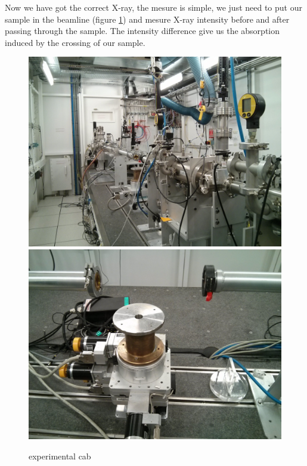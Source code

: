 \documentclass[11pt,a4paper,oneside]{report}
\begin{document}
Now we have got the correct X-ray, the mesure is simple, we just need to put our sample in the beamline (figure \ref{ligne_mesure}) and mesure X-ray intensity before and after passing through the sample. The intensity difference give us the absorption induced by the crossing of our sample.

\begin{figure}[H]
    \begin{center}
        \includegraphics[scale=0.07]{Images/IMG_20151210_203229.jpg}
        \includegraphics[scale=0.07]{Images/IMG_20151210_203316.jpg}
        \caption{experimental cab}
        \label{ligne_mesure}
    \end{center}
\end{figure}
\medskip
\end{document}
